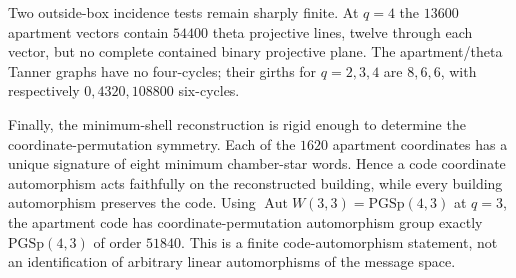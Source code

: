 Two outside-box incidence tests remain sharply finite.  At $q=4$ the $13600$ apartment vectors contain $54400$ theta projective lines, twelve through each vector, but no complete contained binary projective plane.  The apartment/theta Tanner graphs have no four-cycles; their girths for $q=2,3,4$ are $8,6,6$, with respectively $0,4320,108800$ six-cycles.

Finally, the minimum-shell reconstruction is rigid enough to determine the coordinate-permutation symmetry.  Each of the $1620$ apartment coordinates has a unique signature of eight minimum chamber-star words.  Hence a code coordinate automorphism acts faithfully on the reconstructed building, while every building automorphism preserves the code.  Using $\operatorname{Aut}W(3,3)=\mathrm{PGSp}(4,3)$ at $q=3$, the apartment code has coordinate-permutation automorphism group exactly $\mathrm{PGSp}(4,3)$ of order $51840$.  This is a finite code-automorphism statement, not an identification of arbitrary linear automorphisms of the message space.
\fi
